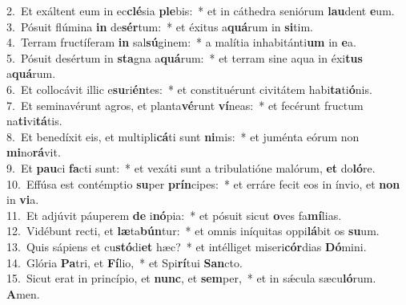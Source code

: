 {2.~}Et exáltent eum in ec\textbf{clé}sia \textbf{ple}bis:~* et in cáthedra seniórum \textbf{lau}dent \textbf{e}um.\\
{3.~}Pósuit flúmina \textbf{in} de\textbf{sér}tum:~* et éxitus a\textbf{quá}rum in \textbf{si}tim.\\
{4.~}Terram fructíferam \textbf{in} sal\textbf{sú}ginem:~* a malítia inhabitánti\textbf{um} in \textbf{e}a.\\
{5.~}Pósuit desértum in \textbf{sta}gna a\textbf{quá}rum:~* et terram sine aqua in éxi\textbf{tus} a\textbf{quá}rum.\\
{6.~}Et collocávit illic e\textbf{su}ri\textbf{én}tes:~* et constituérunt civitátem habi\textbf{ta}ti\textbf{ó}nis.\\
{7.~}Et seminavérunt agros, et planta\textbf{vé}runt \textbf{ví}neas:~* et fecérunt fructum na\textbf{ti}vi\textbf{tá}tis.\\
{8.~}Et benedíxit eis, et multipli\textbf{cá}ti sunt \textbf{ni}mis:~* et juménta eórum non \textbf{mi}no\textbf{rá}vit.\\
{9.~}Et \textbf{pau}ci \textbf{fa}cti sunt:~* et vexáti sunt a tribulatióne malórum, \textbf{et} do\textbf{ló}re.\\
{10.~}Effúsa est contémptio \textbf{su}per \textbf{prín}cipes:~* et erráre fecit eos in ínvio, et \textbf{non} in \textbf{vi}a.\\
{11.~}Et adjúvit páuperem \textbf{de} i\textbf{nó}pia:~* et pósuit sicut \textbf{o}ves fa\textbf{mí}lias.\\
{12.~}Vidébunt recti, et \textbf{læ}ta\textbf{bún}tur:~* et omnis iníquitas oppi\textbf{lá}bit os \textbf{su}um.\\
{13.~}Quis sápiens et cu\textbf{stó}di\textbf{et} hæc?~* et intélliget miseri\textbf{cór}dias \textbf{Dó}mini.\\
{14.~}Glória \textbf{Pa}tri, et \textbf{Fí}lio,~* et Spi\textbf{rí}tui \textbf{San}cto.\\
{15.~}Sicut erat in princípio, et \textbf{nunc}, et \textbf{sem}per,~* et in sǽcula sæcu\textbf{ló}rum. \textbf{A}men.\\
